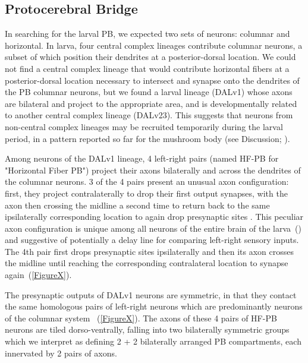     \subsection{Protocerebral Bridge}
    \label{PB}
    In searching for the larval PB, we expected two sets of neurons: columnar and horizontal. In larva, four central complex lineages contribute columnar neurons, a subset of which position their dendrites at a posterior-dorsal location. We could not find a central complex lineage that would contribute horizontal fibers at a posterior-dorsal location necessary to intersect and synapse onto the dendrites of the PB columnar neurons, but we found a larval lineage (DALv1) whose axons are bilateral and project to the appropriate area, and is developmentally related to another central complex lineage (DALv23). This suggests that neurons from non-central complex lineages may be recruited temporarily during the larval period, in a pattern reported so far for the mushroom body (see Discussion; \citep{truman2023metamorphosis}). 

    Among neurons of the DALv1 lineage, 4 left-right pairs (named HF-PB for "Horizontal Fiber PB") project their axons bilaterally and across the dendrites of the columnar neurons.
    3 of the 4 pairs present an unusual axon configuration: first, they project contralaterally to drop their first output synapses, with the axon then crossing the midline a second time to return back to the same ipsilaterally corresponding location to again drop presynaptic sites .
    This peculiar axon configuration is unique among all neurons of the entire brain of the larva~(\citep{winding2023connectome}) and suggestive of potentially a delay line for comparing left-right sensory inputs.
    The 4th pair first drops presynaptic sites ipsilaterally and then its axon crosses the midline until reaching the corresponding contralateral location to synapse again~(\ref{FigureX}).


    The presynaptic outputs of DALv1 neurons are symmetric, in that they contact the same homologous pairs of left-right neurons which are predominantly neurons of the columnar system ~(\ref{FigureX}).
    The axons of these 4 pairs of HF-PB neurons are tiled dorso-ventrally, falling into two bilaterally symmetric groups which we interpret as defining 2 + 2 bilaterally arranged PB compartments, each innervated by 2 pairs of axons. %

